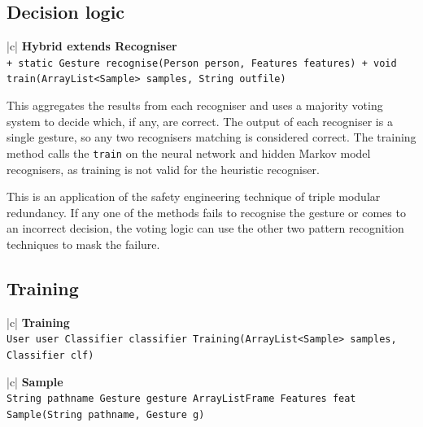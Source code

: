 \documentclass[12pt,a4,notitlepage]{report}
\renewcommand{\_}{\texttt{\symbol{95}}}
\newcommand{\<}{\texttt{\symbol{60}}}
\renewcommand{\>}{\texttt{\symbol{62}}}
\newcommand{\class}[1]{\textbf{#1}}
\newcommand{\variable}[1]{\texttt{#1}}
\begin{document}
\subsection{Decision logic}

\begin{tabular}{|c|} \hline 
\class{Hybrid extends Recogniser} \\ \hline
{}
{ \variable{+ static Gesture recognise(Person person, Features features) \newline
+ void train(ArrayList<Sample> samples, String out\_file)
} } \\ \hline
\end{tabular}

This aggregates the results from each recogniser and uses a majority voting system to decide which, if any, are correct. The output of each recogniser is a single gesture, so any two recognisers matching is considered correct. The training method calls the \variable{train} on the neural network and hidden Markov model recognisers, as training is not valid for the heuristic recogniser.

This is an application of the safety engineering technique of triple modular redundancy. If any one of the methods fails to recognise the gesture or comes to an incorrect decision, the voting logic can use the other two pattern recognition techniques to mask the failure.

\subsection{Training}

\begin{tabular}{|c|} \hline 
\class{Training} \\ \hline
{}
{\variable{User user \newline
Classifier classifier \newline
Training(ArrayList<Sample> samples, Classifier clf)
} } \\ \hline
\end{tabular}

\begin{tabular}{|c|} \hline 
\class{Sample} \\ \hline
{}
{\variable{String pathname \newline
Gesture gesture \newline
ArrayList\<Frame\> \newline
Features feat \newline
Sample(String pathname, Gesture g)
} } \\ \hline
\end{tabular}
\end{document}
